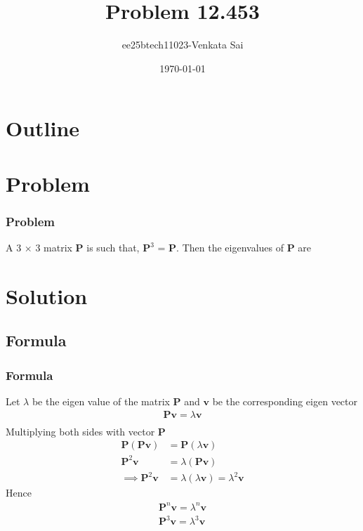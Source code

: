 \documentclass{beamer}
\title{Problem 12.453}
\author{ee25btech11023-Venkata Sai}
\date{\today}
\providecommand{\brak}[1]{\ensuremath{\left(#1\right)}}
\theoremstyle{remark}
\let\vec\mathbf
\numberwithin{equation}{section}
\begin{document}
\begin{frame}
\titlepage
\end{frame}

\section*{Outline}
\begin{frame}
\tableofcontents
\end{frame}

\section{Problem}

\begin{frame}
\frametitle{Problem}
A 3 $\times$ 3 matrix $\vec{P}$ is such that, $\vec{P}^3$ = $\vec{P}$. Then the eigenvalues of $\vec{P}$ are\\
\end{frame}
\section{Solution}


\subsection{Formula}
\begin{frame}
\frametitle{Formula}
  Let $\lambda$ be the eigen value of the matrix $\vec{P}$ and $\vec{v}$ be the corresponding eigen vector
 \begin{align}
     \vec{P}\vec{v}=\lambda\vec{v} \\
 \end{align}
 Multiplying both sides with vector $\vec{P}$
 \begin{align}
     \vec{P}\brak{\vec{P}\vec{v}}&=\vec{P}\brak{\lambda\vec{v}} \\
     \vec{P}^{2}\vec{v}&=\lambda\brak{\vec{P}\vec{v}}\\
     \implies \vec{P}^{2}\vec{v}&=\lambda\brak{\lambda\vec{v}} =\lambda^2\vec{v}
 \end{align}
 Hence
 \begin{align}
     \vec{P}^{n}\vec{v}=\lambda^n\vec{v} \\
     \vec{P}^{3}\vec{v}=\lambda^3\vec{v}
 \end{align}
\end{frame}
\end{document}

